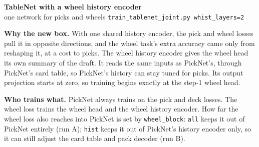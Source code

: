 \documentclass[11pt]{article}
\begin{document}
\begin{center}
{\large\bfseries TableNet with a wheel history encoder}\\[2pt]
{\small one network for picks and wheels \quad\textperiodcentered\quad \texttt{train\_tablenet\_joint.py whist\_layers=2}}
\end{center}
\vspace{6pt}
\begin{center}

\end{center}
\vspace{4pt}
{\small
\noindent\textbf{Why the new box.} With one shared history encoder, the pick and wheel losses pull it in opposite
directions, and the wheel task's extra accuracy came only from reshaping it, at a cost to picks. The wheel history
encoder gives the wheel head its own summary of the draft. It reads the same inputs as PickNet's, through PickNet's
card table, so PickNet's history can stay tuned for picks. Its output
projection starts at zero, so training begins exactly at the step-1 wheel head.

\noindent\textbf{Who trains what.} PickNet always trains on the pick and deck losses. The wheel loss trains the wheel
head and the wheel history encoder. How far the wheel loss also reaches into PickNet is set by \texttt{wheel\_block}:
\texttt{all} keeps it out of PickNet entirely (run A); \texttt{hist} keeps it out of PickNet's history encoder only,
so it can still adjust the card table and pack decoder (run B).
}
\end{document}
